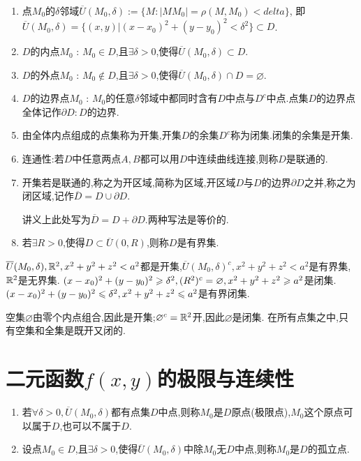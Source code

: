\begin{enumerate}
    \item 点$M_0$的$\delta$邻域$\overline U(M_0,\delta) := \{ M : |MM_0| = \rho(M,M_0) < delta \}$,
    即$\overline U(M_0,\delta) = \{ (x,y) | (x-x_0)^2 + (y-y_0)^2 < \delta^2 \} \subset D$.
    \item $D$的内点$M_0$ : $M_0 \in D$,且$\exists \delta > 0 $,使得$\overline U(M_0,\delta) \subset D$.
    \item $D$的外点$M_0$ : $M_0 \notin D$,且$\exists \delta > 0 $,使得$\overline U(M_0,\delta) \cap D = \varnothing$.
    \item $D$的边界点$M_0$ : $M_0$的任意$\delta$邻域中都同时含有$D$中点与$D^c$中点.点集$D$的边界点全体记作$\partial D: D$的边界.
    \item 由全体内点组成的点集称为开集,开集$D$的余集$D^c$称为闭集.闭集的余集是开集.
    \item 连通性:若$D$中任意两点$A,B$都可以用$D$中连续曲线连接,则称$D$是联通的.
    \item 开集若是联通的,称之为开区域,简称为区域,开区域$D$与$D$的边界$\partial D$之并,称之为闭区域,记作$\overline D = D \cup \partial D$.
    \begin{remark}
    讲义上此处写为$\overline{D} = D + \partial D$.两种写法是等价的.
\end{remark}
    \item 若$\exists R >0$,使得$D \subset \overline{U}(0,R)$,则称$D$是有界集.
\end{enumerate}

\begin{example}
    $\overline U(M_0,\delta), \mathbb{R}^2, x^2+y^2+z^2<a^2$都是开集,$\overline U(M_0,\delta)^c, x^2+y^2+z^2 < a^2$是有界集,$\mathbb{R}^2$是无界集.
    $(x-x_0)^2 + (y-y_0)^2 \geqslant \delta^2, (R^2)^c = \varnothing, x^2+y^2+z^2 \geqslant a^2$是闭集.
    $(x-x_0)^2 + (y-y_0)^2 \leqslant \delta^2, x^2+y^2+z^2 \leqslant a^2$是有界闭集.
\end{example}

\begin{example}
    空集$\varnothing$由零个内点组合,因此是开集;$\varnothing^c = \mathbb{R}^2$开,因此$\varnothing$是闭集.
    在所有点集之中,只有空集和全集是既开又闭的.
\end{example}

\section{二元函数$f(x,y)$的极限与连续性}

\begin{enumerate}
    \item 若$\forall \delta >0, \overline U(M_0,\delta)$都有点集$D$中点,则称$M_0$是$D$原点(极限点),$M_0$这个原点可以属于$D$,也可以不属于$D$.
    \item 设点$M_0 \in D$,且$\exists \delta > 0 $,使得$\overline U(M_0,\delta)$中除$M_0$无$D$中点,则称$M_0$是$D$的孤立点.
\end{enumerate}

